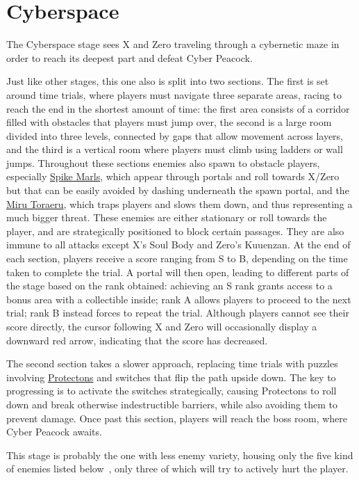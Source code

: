 \section{Cyberspace}
The Cyberspace stage sees X and Zero traveling through a cybernetic maze in order to reach its deepest part and defeat Cyber Peacock.  

Just like other stages, this one also is split into two sections. The first is set around time trials, where players must navigate three separate areas, racing to reach the end in the shortest amount of time: the first area consists of a corridor filled with obstacles that players must jump over, the second is a large room divided into three levels, connected by gaps that allow movement across layers, and the third is a vertical room where players must climb using ladders or wall jumps.  
Throughout these sections enemies also spawn to obstacle players, especially \hyperlink{enem:Spike_Marl}{Spike Marls}, which appear through portals and roll towards X/Zero but that can be easily avoided by dashing underneath the spawn portal, and the \hyperlink{enem:Miru_Toraeru}{Miru Toraeru}, which traps players and slows them down, and thus representing a much bigger threat. These enemies are either stationary or roll towards the player, and are strategically positioned to block certain passages. They are also immune to all attacks except X's Soul Body and Zero's Kuuenzan.  
At the end of each section, players receive a score ranging from S to B, depending on the time taken to complete the trial. A portal will then open, leading to different parts of the stage based on the rank obtained: achieving an S rank grants access to a bonus area with a collectible inside; rank A allows players to proceed to the next trial; rank B instead forces to repeat the trial. Although players cannot see their score directly, the cursor following X and Zero will occasionally display a downward red arrow, indicating that the score has decreased.  

The second section takes a slower approach, replacing time trials with puzzles involving \hyperlink{enem:Protecton}{Protectons} and switches that flip the path upside down. The key to progressing is to activate the switches strategically, causing Protectons to roll down and break otherwise indestructible barriers, while also avoiding them to prevent damage. Once past this section, players will reach the boss room, where Cyber Peacock awaits.  

This stage is probably the one with less enemy variety, housing only the five kind of enemies listed below~\cite{wiki:Cyberspace}, only three of which will try to actively hurt the player.


